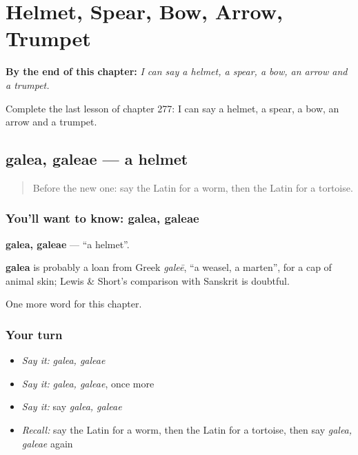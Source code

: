 
\chapter{Helmet, Spear, Bow, Arrow, Trumpet}
\label{ch:la-helmet-spear-bow-arrow-trumpet}

\begin{chapteropening}
\textbf{By the end of this chapter:} \emph{I can say a helmet, a spear, a bow, an arrow and a trumpet.}

Complete the last lesson of chapter 277: I can say a helmet, a spear, a bow, an arrow and a trumpet.
\end{chapteropening}

\section[galea, galeae]{galea, galeae — a helmet}

\label{lesson:LA-C277-galea}



\begin{quote}
Before the new one: say the Latin for a worm, then the Latin for a tortoise.
\end{quote}

\subsection*{You'll want to know: galea, galeae}
\textbf{galea, galeae} — \textquotedblleft{}a helmet\textquotedblright{}.

\begin{cousinweb}
\textbf{galea} is probably a loan from Greek \emph{galeē}, \textquotedblleft{}a weasel, a marten\textquotedblright{}, for a cap of animal skin; Lewis \& Short's comparison with Sanskrit is doubtful.
\end{cousinweb}

\begin{grammarlens}[title={What you've built}]
One more word for this chapter.
\end{grammarlens}

\subsection*{Your turn}
\begin{itemize}
\raggedright
  \item \emph{Say it:} \emph{galea, galeae}
  \item \emph{Say it:} \emph{galea, galeae}, once more
  \item \emph{Say it:} say \emph{galea, galeae}
  \item \emph{Recall:} say the Latin for a worm, then the Latin for a tortoise, then say \emph{galea, galeae} again
\end{itemize}

